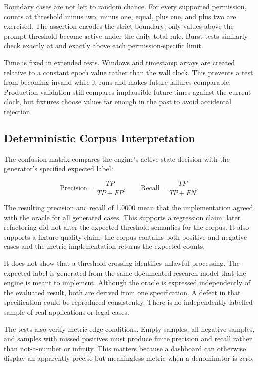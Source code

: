 Boundary cases are not left to random chance. For every supported permission, counts at threshold minus two, minus one, equal, plus one, and plus two are exercised. The assertion encodes the strict boundary: only values above the prompt threshold become active under the daily-total rule. Burst tests similarly check exactly at and exactly above each permission-specific limit.

Time is fixed in extended tests. Windows and timestamp arrays are created relative to a constant epoch value rather than the wall clock. This prevents a test from becoming invalid while it runs and makes future failures comparable. Production validation still compares implausible future times against the current clock, but fixtures choose values far enough in the past to avoid accidental rejection.

\subsection{Deterministic Corpus Interpretation}

The confusion matrix compares the engine's active-state decision with the generator's specified expected label:

\begin{equation}
\mathrm{Precision}=\frac{TP}{TP+FP}, \qquad
\mathrm{Recall}=\frac{TP}{TP+FN}.
\end{equation}

The resulting precision and recall of 1.0000 mean that the implementation agreed with the oracle for all generated cases. This supports a regression claim: later refactoring did not alter the expected threshold semantics for the corpus. It also supports a fixture-quality claim: the corpus contains both positive and negative cases and the metric implementation returns the expected counts.

It does not show that a threshold crossing identifies unlawful processing. The expected label is generated from the same documented research model that the engine is meant to implement. Although the oracle is expressed independently of the evaluated result, both are derived from one specification. A defect in that specification could be reproduced consistently. There is no independently labelled sample of real applications or legal cases.

The tests also verify metric edge conditions. Empty samples, all-negative samples, and samples with missed positives must produce finite precision and recall rather than not-a-number or infinity. This matters because a dashboard can otherwise display an apparently precise but meaningless metric when a denominator is zero.

